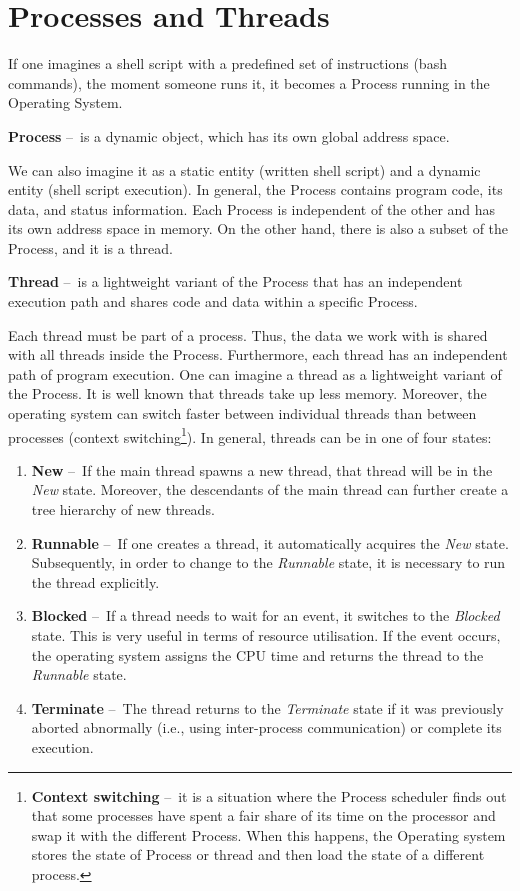 \section{Processes and Threads}
\label{04:processesandthreads}

If one imagines a shell script with a predefined set of instructions (bash commands), the moment someone runs it, it becomes a Process running in the Operating System. 
\begin{definition}
  \textbf{Process} \---\ is a dynamic object, which has its own global address space. 
\end{definition}
We can also imagine it as a static entity (written shell script) and a dynamic entity (shell script execution). In general, the Process contains program code, its data, and status information. Each Process is independent of the other and has its own address space in memory. On the other hand, there is also a subset of the Process, and it is a thread. 
\begin{definition}
  \textbf{Thread} \---\ is a lightweight variant of the Process that has an independent execution path and shares code and data within a specific Process. 
\end{definition}
Each thread must be part of a process. Thus, the data we work with is shared with all threads inside the Process. Furthermore, each thread has an independent path of program execution. One can imagine a thread as a lightweight variant of the Process. It is well known that threads take up less memory. Moreover, the operating system can switch faster between individual threads than between processes (context switching\footnote {\textbf{Context switching} \---\ it is a situation where the Process scheduler finds out that some processes have spent a fair share of its time on the processor and swap it with the different Process. When this happens, the Operating system stores the state of Process or thread and then load the state of a different process.}). In general, threads can be in one of four states:
\begin{enumerate}[itemsep=1mm, parsep=0pt]
        \item \textbf{New} \---\ If the main thread spawns a new thread, that thread will be in the \emph{New} state. Moreover, the descendants of the main thread can further create a tree hierarchy of new threads.
        \item \textbf{Runnable} \---\ If one creates a thread, it automatically acquires the \emph{New} state. Subsequently, in order to change to the \emph{Runnable} state, it is necessary to run the thread explicitly.
        \item \textbf {Blocked} \---\ If a thread needs to wait for an event, it switches to the \emph{Blocked} state. This is very useful in terms of resource utilisation. If the event occurs, the operating system assigns the CPU time and returns the thread to the \emph{Runnable} state.
         \item \textbf{Terminate} \---\ The thread returns to the \emph {Terminate} state if it was previously aborted abnormally (i.e., using inter-process communication) or complete its execution.
\end{enumerate}

